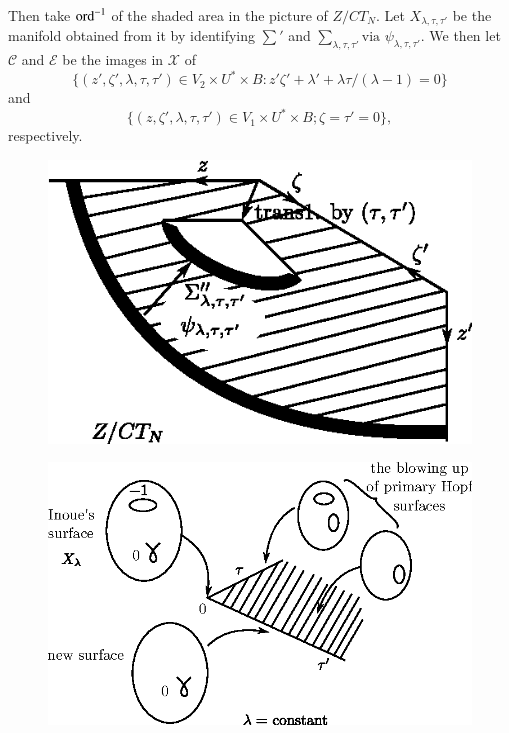    \noindent
   Then take $\operatorname{ord}^{-1}$ of the shaded area in the picture of $Z/CT_N$.
   Let $X_{\lambda, \tau, \tau ' }$ be the manifold obtained from it
   by   identifying $ \sum '$ and $\sum_{\lambda,\tau,\tau'}
   \text{via } \psi_{ \lambda, \tau, \tau '}$.  We then let $\mathscr{C}$ and
   $\mathscr{E}$  be the images in $\mathscr{X}$ of  
   $$
   \{ ( z' , \zeta' , \lambda, \tau , \tau') \in V_2 \times U^* \times B : z'
   \zeta ' + \lambda ' + \lambda \tau/ (\lambda-1) =0\}
$$
 and
$$
 \{ (z, \zeta' , \lambda, \tau, \tau ') \in V_1 \times U^* \times B ; \zeta
   =\tau ' =0\}, 
$$
respectively.
\begin{figure}[H]
\centering 
\includegraphics{vol58-fig/fig58-75.eps} 
\end{figure}
\begin{figure}[H]
\centering 
\includegraphics{vol58-fig/fig58-76.eps} 
\end{figure}\pageoriginale
   
